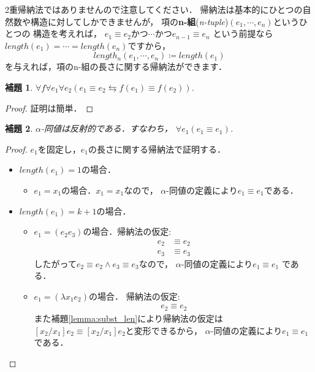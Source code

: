 \documentclass{ltjsbook}%
\newtheorem{lemma}{補題}[section]%
\newcommand\lemmaname{補題}%
\newcommand\term[2]{\textbf{#1}{(\textit{#2})}}%
\begin{document}
2重帰納法ではありませんので注意してください．%
帰納法は基本的にひとつの自然数や構造に対してしかできませんが，%
項の\term{n-組}{n-tuple}$(\mathit{e}_1,\cdots,\mathit{e}_n)$というひとつの%
構造を考えれば，%
$\mathit{e}_1\equiv\mathit{e}_2かつ\cdots%
かつ\mathit{e}_{n-1}\equiv\mathit{e}_n$%
という前提なら%
$length(\mathit{e}_1)=\cdots=length(\mathit{e}_n)$ですから，%
\begin{equation}%
  length_n(\mathit{e}_1,\cdots,\mathit{e}_n)\coloneqq%
  length(\mathit{e}_1)%
\end{equation}%
を与えれば，項のn-組の長さに関する帰納法ができます．%
\begin{lemma}%
  \label{lemma:alpha_fequal}%
  $\forall\mathit{f}\forall\mathit{e}_1\forall\mathit{e}_2%
  (\mathit{e}_1\equiv\mathit{e}_2\leftrightarrows%
  \mathit{f}(\mathit{e}_1)\equiv\mathit{f}(\mathit{e}_2))$.%
\end{lemma}%
\begin{proof}%
  証明は簡単．%
\end{proof}%
\begin{lemma}%
  $\alpha$-同値は反射的である．すなわち，%
  $\forall\mathit{e}_1(\mathit{e}_1\equiv\mathit{e}_1)$.%
\end{lemma}%
\begin{proof}%
  $\mathit{e}_1を固定し$，$\mathit{e}_1$の長さに関する帰納法で証明する．%
  \begin{itemize}%
  \item $length(\mathit{e}_1)=1$の場合．%
  \begin{itemize}%
  \item $\mathit{e}_1=\mathit{x}_1$の場合．$\mathit{x}_1=\mathit{x}_1$なので，%
    $\alpha$-同値の定義により$\mathit{e}_1\equiv\mathit{e}_1$である．%
  \end{itemize}%
  \item $length(\mathit{e}_1)=k + 1$の場合．%
  \begin{itemize}%
  \item $\mathit{e}_1=(\mathit{e}_2\mathit{e}_3)$の場合．帰納法の仮定:%
    \begin{align}%
      \mathit{e}_2&\equiv \mathit{e}_2\\%
      \mathit{e}_3&\equiv \mathit{e}_3%
    \end{align}%
    したがって$\mathit{e}_2\equiv \mathit{e}_2%
    \land \mathit{e}_3\equiv \mathit{e}_3$なので，%
    $\alpha$-同値の定義により$\mathit{e}_1\equiv \mathit{e}_1$%
    である．%
  \item $\mathit{e}_1=(\lambda \mathit{x}_1\mathit{e}_2)$の場合．%
    帰納法の仮定:%
    \begin{align}%
      \mathit{e}_2\equiv\mathit{e}_2%
    \end{align}%
    また\lemmaname\ref{lemma:subst_len}により帰納法の仮定は%
    $[\mathit{x}_2/\mathit{x}_1]\mathit{e}_2\equiv%
    [\mathit{x}_2/\mathit{x}_1]\mathit{e}_2$と変形できるから，%
    $\alpha$-同値の定義により$\mathit{e}_1\equiv \mathit{e}_1$である．%
  \end{itemize}%
  \end{itemize}%
\end{proof}%
\end{document}
